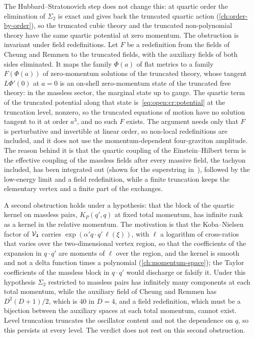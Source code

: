 The Hubbard--Stratonovich step does not change this: at quartic order the elimination of $\Sigma_2$ is exact and gives back the truncated quartic action (\cref{ch:order-by-order}), so the truncated cubic theory and the truncated non-polynomial theory have the same quartic potential at zero momentum.
The obstruction is invariant under field redefinitions.
Let $F$ be a redefinition from the fields of Cheung and Remmen to the truncated fields, with the auxiliary fields of both sides eliminated.
It maps the family $\Phi(a)$ of flat metrics to a family $F(\Phi(a))$ of zero-momentum solutions of the truncated theory, whose tangent $L \Phi'(0)$ at $a = 0$ is an on-shell zero-momentum state of the truncated free theory: in the massless sector, the marginal state up to gauge.
The quartic term of the truncated potential along that state is~\eqref{eq:open:cr:potential} at the truncation level, nonzero, so the truncated equations of motion have no solution tangent to it at order $a^3$, and no such $F$ exists.
The argument needs only that $F$ is perturbative and invertible at linear order, so non-local redefinitions are included, and it does not use the momentum-dependent four-graviton amplitude.
The reason behind it is that the quartic coupling of the Einstein--Hilbert term is the effective coupling of the massless fields after every massive field, the tachyon included, has been integrated out (shown for the superstring in~\cite{Sen:2017:WilsonianEffectiveAction}), followed by the low-energy limit and a field redefinition, while a finite truncation keeps the elementary vertex and a finite part of the exchanges.

A second obstruction holds under a hypothesis: that the block of the quartic kernel on massless pairs, $K_P(q', q)$ at fixed total momentum, has infinite rank as a kernel in the relative momentum.
The motivation is that the Koba--Nielsen factor of $\mathcal{V}_{4}$ carries $\exp(\alpha' q \cdot q' \, \ell(\xi))$, with $\ell$ a logarithm of cross-ratios that varies over the two-dimensional vertex region, so that the coefficients of the expansion in $q \cdot q'$ are moments of $\ell$ over the region, and the kernel is smooth and not a delta function times a polynomial (\cref{ch:momentum-space}); the Taylor coefficients of the massless block in $q \cdot q'$ would discharge or falsify it.
Under this hypothesis $\Sigma_2$ restricted to massless pairs has infinitely many components at each total momentum, while the auxiliary field of Cheung and Remmen has $D^2 (D + 1) / 2$, which is $40$ in $D = 4$, and a field redefinition, which must be a bijection between the auxiliary spaces at each total momentum, cannot exist.
Level truncation truncates the oscillator content and not the dependence on $q$, so this persists at every level.
The verdict does not rest on this second obstruction.

